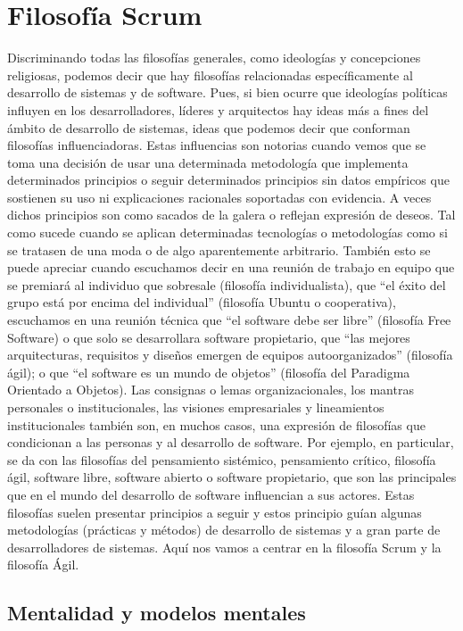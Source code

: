 \chapter{Filosofía Scrum}

Discriminando todas las filosofías generales, como ideologías y concepciones religiosas, podemos decir que hay filosofías relacionadas específicamente al desarrollo de sistemas y de software. Pues, si bien ocurre que ideologías políticas influyen en los desarrolladores, líderes y arquitectos hay ideas más a fines del ámbito de desarrollo de sistemas, ideas que podemos decir que conforman filosofías influenciadoras. Estas influencias son notorias cuando vemos que se toma una decisión de usar una determinada metodología que implementa determinados principios o seguir determinados principios sin datos empíricos que sostienen su uso ni explicaciones racionales soportadas con evidencia. A veces dichos principios son como sacados de la galera o reflejan expresión de deseos. Tal como sucede cuando se aplican determinadas tecnologías o metodologías como si se tratasen de una moda o de algo aparentemente arbitrario. También esto se puede apreciar cuando escuchamos decir en una reunión de trabajo en equipo que se premiará al individuo que sobresale (filosofía individualista), que “el éxito del grupo está por encima del individual” (filosofía Ubuntu o cooperativa), escuchamos en una reunión técnica que “el software debe ser libre” (filosofía Free Software) o que solo se desarrollara software propietario, que “las mejores arquitecturas, requisitos y diseños emergen de equipos autoorganizados” \cite{Beck-2001} (filosofía ágil); o que “el software es un mundo de objetos” (filosofía del Paradigma Orientado a Objetos). Las consignas o lemas organizacionales, los mantras personales o institucionales, las visiones empresariales y lineamientos institucionales también son, en muchos casos, una expresión de filosofías que condicionan a las personas y al desarrollo de software. Por ejemplo, en particular, se da con las filosofías del pensamiento sistémico, pensamiento crítico, filosofía ágil, software libre, software abierto o software propietario, que son las principales que en el mundo del desarrollo de software influencian a sus actores. Estas filosofías suelen presentar principios a seguir y estos principio guían algunas metodologías (prácticas y métodos) de desarrollo de sistemas y a gran parte de desarrolladores de sistemas. Aquí nos vamos a centrar en la filosofía Scrum y la filosofía Ágil.

\section{Mentalidad y modelos mentales}

